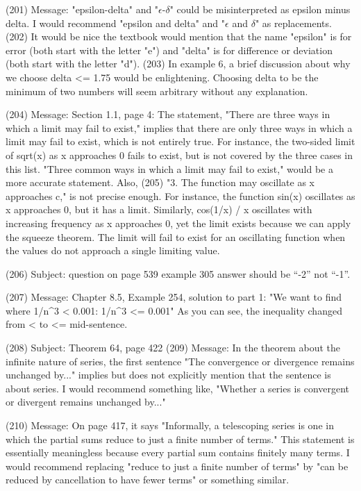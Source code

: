 {(201)  Message: "epsilon-delta" and "$\epsilon$-$\delta$" could be misinterpreted as epsilon minus delta. I would recommend "epsilon and delta" and "$\epsilon$ and $\delta$" as replacements.       
(202)  It would be nice the textbook would mention that the name "epsilon" is for error (both start with the letter "e") and "delta" is for difference or deviation (both start with the letter "d").       
(203)  In example 6, a brief discussion about why we choose delta <= 1.75 would be enlightening. Choosing delta to be the minimum of two numbers will seem arbitrary without any explanation.

(204)  Message: Section 1.1, page 4: The statement, "There are three ways in which a limit may fail to exist," implies that there are only three ways in which a limit may fail to exist, which is not entirely true. For instance, the two-sided limit of sqrt(x) as x approaches 0 fails to exist, but is not covered by the three cases in this list. "Three common ways in which a limit may fail to exist," would be a more accurate statement. Also,   
(205)  "3. The function may oscillate as x approaches c," is not precise enough. For instance, the function sin(x) oscillates as x approaches 0, but it has a limit. Similarly, cos(1/x) / x oscillates with increasing frequency as x approaches 0, yet the limit exists because we can apply the squeeze theorem. The limit will fail to exist for an oscillating function when the values do not approach a single limiting value.

(206)  Subject: question on page 539 example 305     answer should be ``-2'' not ``-1''.

(207)  Message: Chapter 8.5, Example 254, solution to part 1: "We want to find where 1/n^3 < 0.001: 1/n^3 <= 0.001" As you can see, the inequality changed from < to <= mid-sentence.

(208)  Subject: Theorem 64, page 422
(209)  Message: In the theorem about the infinite nature of series, the first sentence "The convergence or divergence remains unchanged by..." implies but does not explicitly mention that the sentence is about series. I would recommend something like, "Whether a series is convergent or divergent remains unchanged by..."

(210)  Message: On page 417, it says "Informally, a telescoping series is one in which the partial sums reduce to just a finite number of terms." This statement is essentially meaningless because every partial sum contains finitely many terms. I would recommend replacing "reduce to just a finite number of terms" by "can be reduced by cancellation to have fewer terms" or something similar.

}
